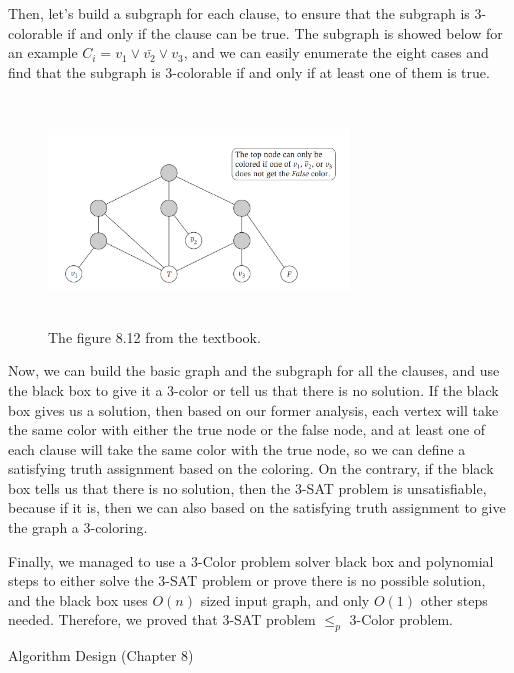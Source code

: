 \documentclass{article}
\begin{document}
Then, let's build a subgraph for each clause, to ensure that the subgraph is 3-colorable if and only if the clause can be true. The subgraph is showed below for an example $C_i=v_1\lor\bar{v_2}\lor v_3$, and we can easily enumerate the eight cases and find that the subgraph is 3-colorable if and only if at least one of them is true.

\begin{figure}[h]
    \centering
    \includegraphics[height=6cm,width=8cm]{figure/2.png}
    \caption{The figure 8.12 from the textbook.}
    \label{2}
\end{figure}

Now, we can build the basic graph and the subgraph for all the clauses, and use the black box to give it a 3-color or tell us that there is no solution. If the black box gives us a solution, then based on our former analysis, each vertex will take the same color with either the true node or the false node, and at least one of each clause will take the same color with the true node, so we can define a satisfying truth assignment based on the coloring. On the contrary, if the black box tells us that there is no solution, then the 3-SAT problem is unsatisfiable, because if it is, then we can also based on the satisfying truth assignment to give the graph a 3-coloring.

Finally, we managed to use a 3-Color problem solver black box and polynomial steps to either solve the 3-SAT problem or prove there is no possible solution, and the black box uses $O(n)$ sized input graph, and only $O(1)$ other steps needed. Therefore, we proved that 3-SAT problem $\leq_p$ 3-Color problem.

\newpage  %

\renewcommand\refname{References}  %
\begin{thebibliography}{99}
     Algorithm Design (Chapter 8)
\end{thebibliography}
\end{document}
